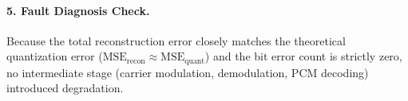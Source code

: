 \documentclass[a4paper]{article}
\begin{document}
    \paragraph{5. Fault Diagnosis Check.}                                                                  
    Because the total reconstruction error closely matches the theoretical quantization error              
    ($\text{MSE}_{\text{recon}} \approx \text{MSE}_{\text{quant}}$) and the bit error count is strictly    
    zero, no intermediate stage (carrier modulation, demodulation, PCM decoding) introduced degradation.
\end{document}
